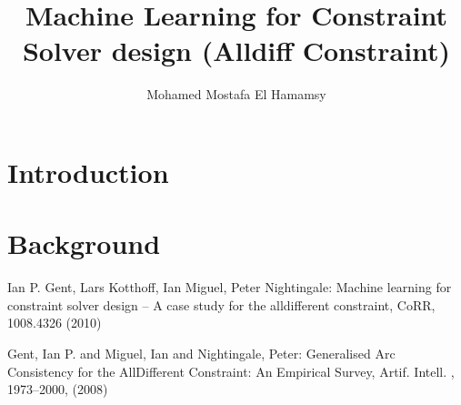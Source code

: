 \documentclass{llncs}
\begin{document}
%
\frontmatter          %
%
\pagestyle{headings}  %
%
\title{Machine Learning for Constraint Solver design (Alldiff Constraint)}
%
%
\author{Mohamed Mostafa El Hamamsy}

\maketitle              %

\begin{abstract}

\end{abstract}
%
\section{Introduction}
%

%
\section{Background}
%

%
%
\begin{thebibliography}{5}
%

Ian P. Gent, Lars Kotthoff, Ian Miguel, Peter Nightingale:
Machine learning for constraint solver design -- {A} case study for the alldifferent constraint,
CoRR, 1008.4326 (2010)

Gent, Ian P. and Miguel, Ian and Nightingale, Peter:
Generalised Arc Consistency for the AllDifferent Constraint: An Empirical Survey,
Artif. Intell. , 1973--2000, (2008)

\end{thebibliography}
% 
\end{document}

